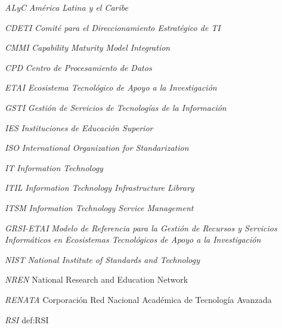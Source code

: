 



	{\textit{ALyC}}
	{\textit{América Latina y el Caribe}}

    {\textit{CDETI}}
    {\textit{Comité para el Direccionamiento Estratégico de TI}}

    {\textit{CMMI}}
    {\textit{Capability Maturity Model Integration}}

	{\textit{CPD}}
	{\textit{Centro de Procesamiento de Datos}}

    {\textit{ETAI}}
    {\textit{Ecosistema Tecnológico de Apoyo a la Investigación}}


    {\textit{GSTI}}
    {\textit{Gestión de Servicios de Tecnologías de la Información}}

    {\textit{IES}}
    {\textit{Instituciones de Educación Superior}}

    {\textit{\textit{ISO}}}
    {\textit{International Organization for Standarization}}

	{\textit{IT}}
	{\textit{Information Technology}}

    {\textit{ITIL}}
    {\textit{Information Technology Infrastructure Library}}

    {\textit{ITSM}}
    {\textit{Information Technology Service Management}}


    {\textit{GRSI-ETAI}}
    {\textit{Modelo de Referencia para la Gestión de Recursos y Servicios Informáticos en Ecosistemas Tecnológicos de Apoyo a la Investigación}
    }


    {\textit{NIST}}
    {\textit{National Institute of Standards and Technology}}

    {\textit{NREN}}
    {National Research and Education Network}

    {\textit{RENATA}}
    {Corporación Red Nacional Académica de Tecnología Avanzada}

    {\textit{RSI}}
    {\gls{def:RSI}}

